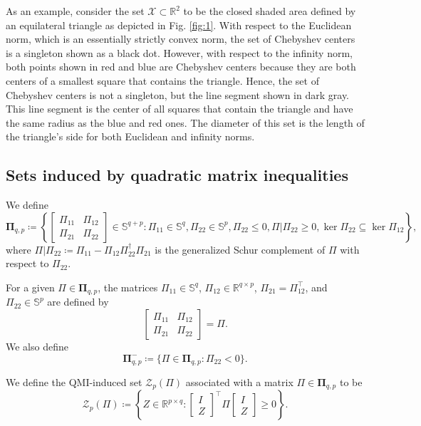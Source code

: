 \documentclass[pdflatex,sn-mathphys-num]{sn-jnl}%
\theoremstyle{thmstyleone}
\begin{document}
As an example, consider the set $\mathcal{X}\subset\mathbb{R}^2$ to be the closed shaded area defined by an equilateral triangle as depicted in Fig. \ref{fig:1}. With respect to the Euclidean norm, which is an essentially strictly convex norm, the set of Chebyshev centers is a singleton shown as a black dot. However, with respect to the infinity norm, both points shown in red and blue are Chebyshev centers because they are both centers of a smallest square that contains the triangle. Hence, the set of Chebyshev centers is not a singleton, but the line segment shown in dark gray. This line segment is the center of all squares that contain the triangle and have the same radius as the blue and red ones. The diameter of this set is the length of the triangle's side for both Euclidean and infinity norms.

\subsection{Sets induced by quadratic matrix inequalities}

We define
\begin{equation}
\pmb{\Pi}_{q,p}\!\coloneqq\! \left\{\!\begin{bmatrix}
\Pi_{11} & \Pi_{12} \\
\Pi_{21} & \Pi_{22}
\end{bmatrix}\!\in\!\mathbb{S}^{q+p}\!:\! \Pi_{11}\!\in\!\mathbb{S}^q,\Pi_{22}\!\in\!\mathbb{S}^p,\Pi_{22}\leq 0,\Pi|\Pi_{22}\geq 0,
\ker\Pi_{22}\!\subseteq\!\ker\Pi_{12}\!\right\}\!,
\end{equation}
where $\Pi|\Pi_{22}\coloneqq \Pi_{11}-\Pi_{12}\Pi_{22}^\dagger \Pi_{21}$ is the generalized Schur complement of $\Pi$ with respect to $\Pi_{22}$. 

For a given $\Pi\in\pmb{\Pi}_{q,p}$, the matrices $\Pi_{11}\in\mathbb{S}^q$, $\Pi_{12}\in\mathbb{R}^{q\times p}$, $\Pi_{21}=\Pi_{12}^\top$, and $\Pi_{22}\in\mathbb{S}^p$ are defined by
\begin{equation}
\begin{bmatrix}
\Pi_{11} & \Pi_{12} \\
\Pi_{21} & \Pi_{22}
\end{bmatrix}=\Pi.
\end{equation}
We also define
\begin{equation}
\pmb{\Pi}_{q,p}^-\coloneqq \{\Pi\in\pmb{\Pi}_{q,p}:\Pi_{22}<0\}.
\end{equation}

We define the QMI-induced set $\mathcal{Z}_p(\Pi)$ associated with a matrix $\Pi\in\pmb{\Pi}_{q,p}$ to be
\begin{equation}
\label{eq:Zp}
\mathcal{Z}_p(\Pi)\coloneqq \left\{Z\in\mathbb{R}^{p\times q}:\begin{bmatrix}
I \\ Z
\end{bmatrix}^\top \Pi \begin{bmatrix}
I \\ Z
\end{bmatrix}\geq 0\right\}.
\end{equation}
\end{document}

